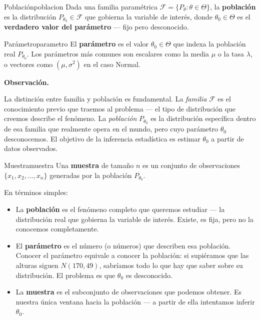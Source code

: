 \documentclass[12pt, a4paper]{book}
\newenvironment{observacion}{%
    \par\medskip\noindent\textbf{\color{azul}Observaci\'{o}n.}\enspace\itshape
}{\par\medskip}
\numberwithin{equation}{chapter}
\begin{document}
\begin{definicion}{Poblaci\'{o}n}{poblacion}
	Dada una familia paramétrica $\mathcal{F} = \{P_\theta :
	\theta \in \Theta\}$, la \textbf{población} es la
	distribución $P_{\theta_0} \in \mathcal{F}$ que gobierna
	la variable de interés, donde $\theta_0 \in \Theta$ es el
	\textbf{verdadero valor del parámetro} --- fijo pero
	desconocido.
\end{definicion}

\begin{definicion}{Par\'{a}metro}{parametro}
	El \textbf{parámetro} es el valor $\theta_0 \in \Theta$
	que indexa la población real $P_{\theta_0}$. Los parámetros
	más comunes son escalares como la media $\mu$ o la tasa
	$\lambda$, o vectores como $(\mu, \sigma^2)$ en el caso
	Normal.
\end{definicion}

\begin{observacion}
	La distinción entre familia y población es fundamental.
	La \emph{familia} $\mathcal{F}$ es el conocimiento previo
	que traemos al problema --- el tipo de distribución que
	creemos describe el fenómeno. La \emph{población}
	$P_{\theta_0}$ es la distribución específica dentro de
	esa familia que realmente opera en el mundo, pero cuyo
	parámetro $\theta_0$ desconocemos. El objetivo de la
	inferencia estadística es estimar $\theta_0$ a partir
	de datos observados.
\end{observacion}

\begin{definicion}{Muestra}{muestra}
	Una \textbf{muestra} de tamaño $n$ es un conjunto de
	observaciones $\{x_1, x_2, \ldots, x_n\}$ generadas por
	la población $P_{\theta_0}$.
\end{definicion}

En términos simples:

\begin{itemize}[leftmargin=2em]
	\item La \textbf{población} es el fenómeno completo que
	queremos estudiar --- la distribución real que gobierna
	la variable de interés. Existe, es fija, pero no la
	conocemos completamente.
	\item El \textbf{parámetro} es el número (o números) que
	describen esa población. Conocer el parámetro equivale
	a conocer la población: si supiéramos que las alturas
	siguen $N(170, 49)$, sabríamos todo lo que hay que saber
	sobre su distribución. El problema es que $\theta_0$
	es desconocido.
	\item La \textbf{muestra} es el subconjunto de
	observaciones que podemos obtener. Es nuestra única
	ventana hacia la población --- a partir de ella
	intentamos inferir $\theta_0$.
\end{itemize}
\end{document}
